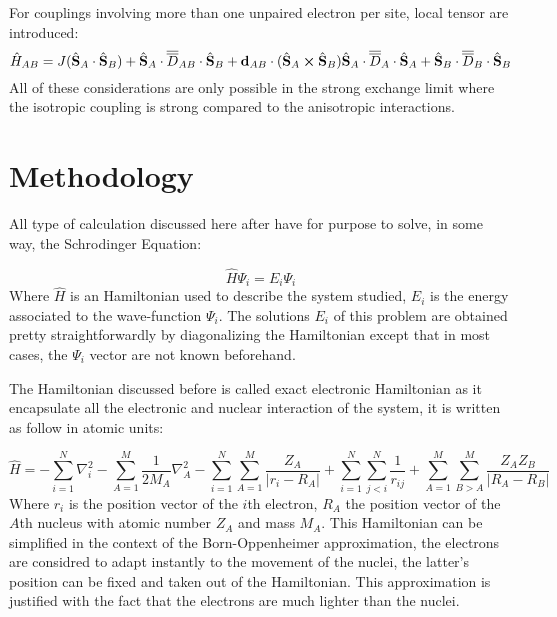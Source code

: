\documentclass[12pt]{article}
\numberwithin{equation}{section}
\begin{document}
For couplings involving more than one unpaired electron per site, local tensor are introduced:
\begin{equation}
    \hat{H}_{AB}=J(\hat{\vb S}_A \cdot \hat{\vb S}_B) + \hat{\vb S}_A \cdot\overline{\overline{D}}_{AB} \cdot \hat{\vb S}_B + \vb{d}_{AB} \cdot (\hat{\vb S}_A \cross \hat{\vb S}_B) \hat{\vb S}_A \cdot\overline{\overline{D}}_{A} \cdot \hat{\vb S}_A +\hat{\vb S}_B \cdot\overline{\overline{D}}_{B} \cdot \hat{\vb S}_B
\end{equation}
All of these considerations are only possible in the strong exchange limit where the isotropic coupling is strong compared to the anisotropic interactions.

\section{Methodology}

All type of calculation discussed here after have for purpose to solve, in some way, the Schrodinger Equation:

\begin{equation}
    \hat{H}\Psi_i=E_i\Psi_i
\end{equation}
Where $\hat{H}$ is an Hamiltonian used to describe the system studied, $E_i$ is the energy associated to the wave-function $\Psi_i$. The solutions $E_i$ of this problem are obtained pretty straightforwardly by diagonalizing the Hamiltonian except that in most cases, the $\Psi_i$ vector are not known beforehand.

The Hamiltonian discussed before is called exact electronic Hamiltonian as it encapsulate all the electronic and nuclear interaction of the system, it is written as follow in atomic units:

\begin{equation}
    \hat{H}=-\sum_{i=1}^{N}\nabla_i^2-\sum_{A=1}^{M}\frac{1}{2M_A}\nabla_A^2%
    -\sum_{i=1}^{N}\sum_{A=1}^{M}\frac{Z_A}{|r_i-R_A|}+\sum_{i=1}^{N}\sum_{j<i}^{N}\frac{1}{r_{ij}}%
    +\sum_{A=1}^{M}\sum_{B>A}^{M}\frac{Z_A Z_B}{|R_A-R_B|}
\end{equation}
Where $r_i$ is the position vector of the $i$th electron, $R_A$ the position vector of the $A$th nucleus with atomic number $Z_A$ and mass $M_A$.
This Hamiltonian can be simplified in the context of the Born-Oppenheimer approximation, the electrons are considred to adapt instantly to the movement of the nuclei, the latter's position can be fixed and taken out of the Hamiltonian.
This approximation is justified with the fact that the electrons are much lighter than the nuclei. 
\end{document}
